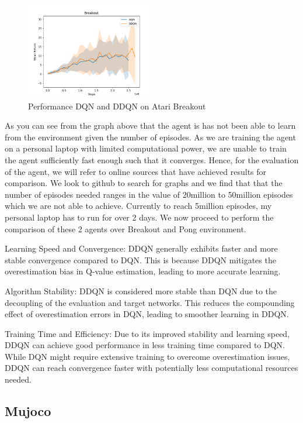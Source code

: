 \documentclass{article}
\begin{document}
\begin{figure}[h]
    \centering
    \includegraphics[width=0.5\textwidth]{img/breakout.png}
    \caption{Performance DQN and DDQN on Atari Breakout}
\end{figure}

As you can see from the graph above that the agent is has not been able to
learn from the environment given the number of episodes. As we are training the
agent on a personal laptop with limited computational power, we are unable to
train the agent sufficiently fast enough such that it converges. Hence, for the
evaluation of the agent, we will refer to online sources that have achieved
results for comparison. We look to github to search for graphs and we find that
that the number of episodes needed ranges in the value of 20million to
50million episodes which we are not able to achieve. Currently to reach
5million episodes, my personal laptop has to run for over 2 days. We now
proceed to perform the comparison of these 2 agents over Breakout and Pong
environment.

Learning Speed and Convergence: DDQN generally exhibits faster and more stable
convergence compared to DQN. This is because DDQN mitigates the overestimation
bias in Q-value estimation, leading to more accurate learning.

Algorithm Stability: DDQN is considered more stable than DQN due to the
decoupling of the evaluation and target networks. This reduces the compounding
effect of overestimation errors in DQN, leading to smoother learning in DDQN.

Training Time and Efficiency: Due to its improved stability and learning speed,
DDQN can achieve good performance in less training time compared to DQN. While
DQN might require extensive training to overcome overestimation issues, DDQN
can reach convergence faster with potentially less computational resources
needed.

\subsection*{Mujoco}
\end{document}
